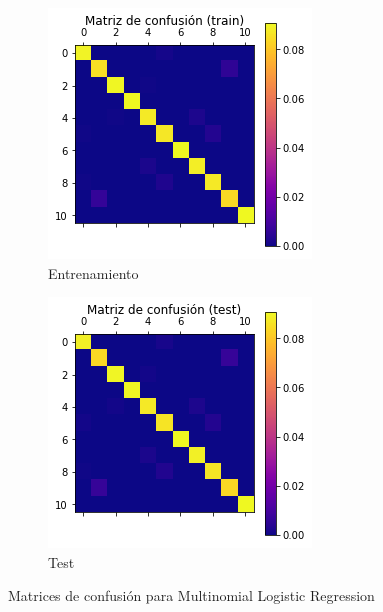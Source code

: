 \documentclass[10pt,a4paper]{article}
\begin{document}
\begin{figure}[h]
	\begin{subfigure}{0.5\textwidth}
		\centering
		\includegraphics[width=\textwidth]{cla_confusion_mlr_train}
		\caption{Entrenamiento}
	\end{subfigure}
	\begin{subfigure}{0.5\textwidth}
		\centering
		\includegraphics[width=\textwidth]{cla_confusion_mlr_test}
		\caption{Test}
	\end{subfigure}
	\caption{Matrices de confusión para Multinomial Logistic Regression}
	\label{fig:cla_confusion_mlr}
\end{figure}
\end{document}
